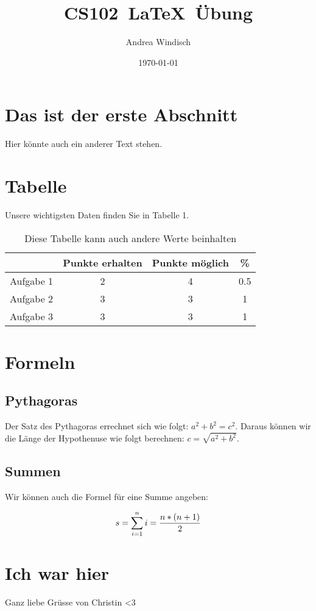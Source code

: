 \documentclass{article}
\author{Andrea Windisch}
\title{CS102\ \LaTeX\ Übung}
\date{\today}
\begin{document}
\maketitle
\section{Das ist der erste Abschnitt}
Hier könnte auch ein anderer Text stehen.
\section{Tabelle}
Unsere wichtigsten Daten finden Sie in Tabelle 1.
\begin{table}[h]
\begin{tabular}{c|c|c|c}
\quad & Punkte erhalten & Punkte möglich & \% \\
\hline
Aufgabe 1 & 2 & 4 & 0.5\\
Aufgabe 2 & 3 & 3 & 1\\
Aufgabe 3 & 3 & 3 & 1\\
\end{tabular}
\caption{Diese Tabelle kann auch andere Werte beinhalten}
\end{table}
\label{Tab 1}
\section{Formeln}
\subsection{Pythagoras}
Der Satz des Pythagoras errechnet sich wie folgt: $a^{2}+b^{2}=c^{2}.$
Daraus können wir die Länge der Hypothenuse wie folgt berechnen: $c=\sqrt{a^{2}+b^{2}}.$
\subsection{Summen}
\begin{flushleft}
Wir können auch die Formel für eine Summe angeben:\\
\end{flushleft}
\begin{equation}
\centering
s=\sum_{i=1}^n{i}=\frac{n*(n+1)}{2}
\end{equation}

\section{Ich war hier}
Ganz liebe Grüsse von Christin
<3
\end{document}
